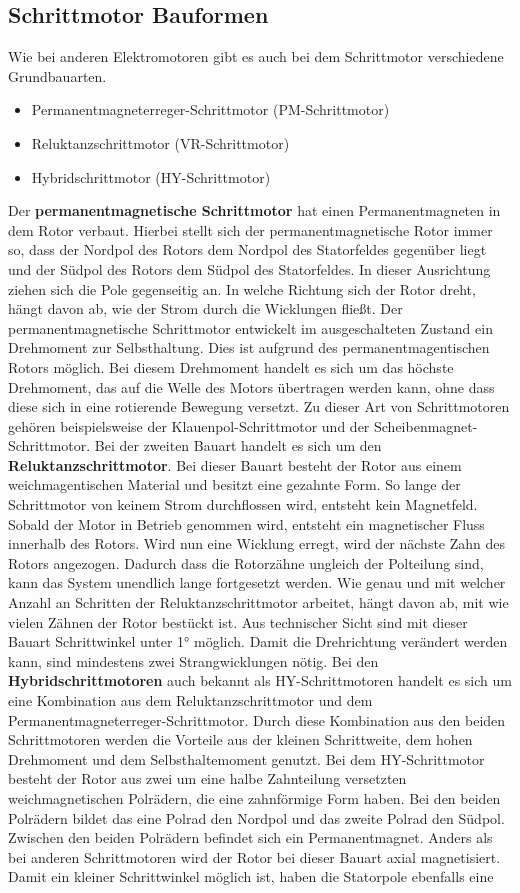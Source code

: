 \subsection{Schrittmotor Bauformen}
Wie bei anderen Elektromotoren gibt es auch bei dem Schrittmotor verschiedene Grundbauarten. 
\begin{itemize}
	\item {Permanentmagneterreger-Schrittmotor (PM-Schrittmotor)}
	\item {Reluktanzschrittmotor (VR-Schrittmotor)}
	\item {Hybridschrittmotor (HY-Schrittmotor)}
\end{itemize}
Der \textbf{permanentmagnetische Schrittmotor} hat einen Permanentmagneten in dem Rotor verbaut. Hierbei stellt sich der permanentmagnetische Rotor immer so, dass der Nordpol des Rotors dem Nordpol des Statorfeldes gegenüber liegt und der Südpol des Rotors dem Südpol des Statorfeldes. In dieser Ausrichtung ziehen sich die Pole gegenseitig an. In welche Richtung sich der Rotor dreht, hängt davon ab, wie der Strom durch die Wicklungen fließt. Der permanentmagnetische Schrittmotor entwickelt im ausgeschalteten Zustand ein Drehmoment zur Selbsthaltung. Dies ist aufgrund des permanentmagentischen Rotors möglich. Bei diesem Drehmoment handelt es sich um das höchste Drehmoment, das auf die Welle des Motors übertragen werden kann, ohne dass diese sich in eine rotierende Bewegung versetzt. Zu dieser Art von Schrittmotoren gehören beispielsweise der Klauenpol-Schrittmotor und der Scheibenmagnet-Schrittmotor. Bei der zweiten Bauart handelt es sich um den \textbf{Reluktanzschrittmotor}. Bei dieser Bauart besteht der Rotor aus einem weichmagentischen Material und besitzt eine gezahnte Form. So lange der Schrittmotor von keinem Strom durchflossen wird, entsteht kein Magnetfeld. Sobald der Motor in Betrieb genommen wird, entsteht ein magnetischer Fluss innerhalb des Rotors. Wird nun eine Wicklung erregt, wird der nächste Zahn des Rotors angezogen. Dadurch dass die Rotorzähne ungleich der Polteilung sind, kann das System unendlich lange fortgesetzt werden. Wie genau und mit welcher Anzahl an Schritten der Reluktanzschrittmotor arbeitet, hängt davon ab, mit wie vielen Zähnen der Rotor bestückt ist. Aus technischer Sicht sind mit dieser Bauart Schrittwinkel unter 1° möglich. Damit die Drehrichtung verändert werden kann, sind mindestens zwei Strangwicklungen nötig. Bei den \textbf{Hybridschrittmotoren} auch bekannt als HY-Schrittmotoren handelt es sich um eine Kombination aus dem Reluktanzschrittmotor und dem Permanentmagneterreger-Schrittmotor. Durch diese Kombination aus den beiden Schrittmotoren werden die Vorteile aus der kleinen Schrittweite, dem hohen Drehmoment und dem Selbsthaltemoment genutzt. Bei dem HY-Schrittmotor besteht der Rotor aus zwei um eine halbe Zahnteilung versetzten weichmagnetischen Polrädern, die eine zahnförmige Form haben. Bei den beiden Polrädern bildet das eine Polrad den Nordpol und das zweite Polrad den Südpol. Zwischen den beiden Polrädern befindet sich ein Permanentmagnet. Anders als bei anderen Schrittmotoren wird der Rotor bei dieser Bauart axial magnetisiert. Damit ein kleiner Schrittwinkel möglich ist, haben die Statorpole ebenfalls eine 